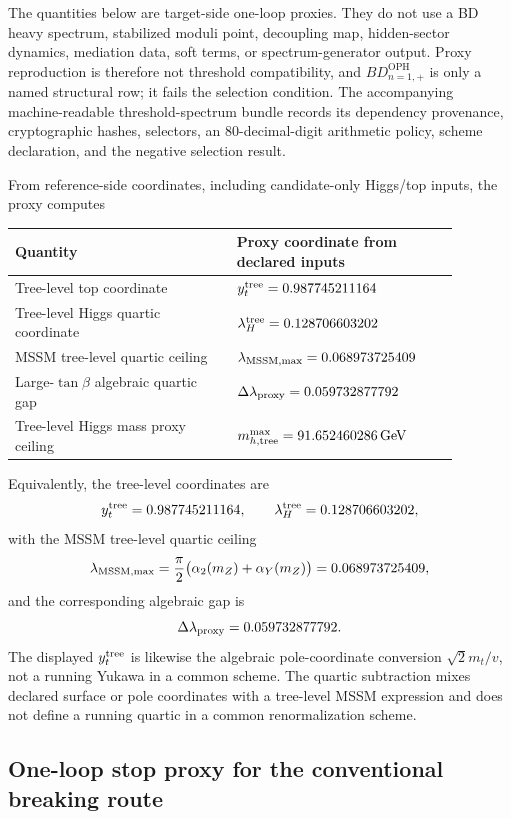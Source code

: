 \documentclass[11pt]{article}
\theoremstyle{remark}
\theoremstyle{plain}
\newcommand{\OPH}{\mathrm{OPH}}
\begin{document}
The quantities below are target-side one-loop proxies. They do not use a BD heavy spectrum,
stabilized moduli point, decoupling map, hidden-sector dynamics, mediation data, soft terms, or
spectrum-generator output. Proxy reproduction is therefore not threshold compatibility, and
\(BD_{n=1,+}^{\OPH}\) is only a named structural row; it fails the selection condition. The accompanying machine-readable threshold-spectrum bundle records its
dependency provenance, cryptographic hashes, selectors, an 80-decimal-digit
arithmetic policy, scheme declaration, and the negative selection result.

From reference-side coordinates, including candidate-only Higgs/top inputs, the proxy computes
\begin{longtable}{L{0.44\linewidth}L{0.44\linewidth}}
\toprule
\textbf{Quantity} & \textbf{Proxy coordinate from declared inputs} \\
\midrule
Tree-level top coordinate & \(y_t^{\rm tree}=0.987745211164\) \\
Tree-level Higgs quartic coordinate & \(\lambda_H^{\rm tree}=0.128706603202\) \\
MSSM tree-level quartic ceiling & \(\lambda_{\rm MSSM,max}=0.068973725409\) \\
Large-\(\tan\beta\) algebraic quartic gap & \(\Delta\lambda_{\rm proxy}=0.059732877792\) \\
Tree-level Higgs mass proxy ceiling & \(m_{h,\rm tree}^{\rm max}=91.652460286\,\mathrm{GeV}\) \\
\bottomrule
\end{longtable}

Equivalently, the tree-level coordinates are
\[
y_t^{\rm tree}=0.987745211164,
\qquad
\lambda_H^{\rm tree}=0.128706603202,
\]
with the MSSM tree-level quartic ceiling
\[
\lambda_{\rm MSSM,max}
=\frac{\pi}{2}\bigl(\alpha_2(m_Z)+\alpha_Y(m_Z)\bigr)
=0.068973725409,
\]
and the corresponding algebraic gap is
\[
\Delta\lambda_{\rm proxy}=0.059732877792.
\]
The displayed \(y_t^{\rm tree}\) is likewise the algebraic pole-coordinate conversion
\(\sqrt2m_t/v\), not a running Yukawa in a common scheme. The quartic subtraction mixes declared
surface or pole coordinates with a tree-level MSSM expression and does not define a running
quartic in a common renormalization scheme.

\subsection{One-loop stop proxy for the conventional breaking route}
\end{document}
